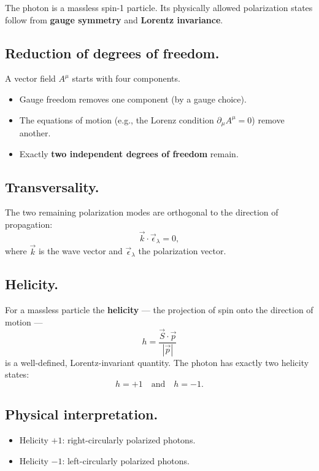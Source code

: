 The photon is a massless spin-1 particle. Its physically allowed polarization states
follow from \textbf{gauge symmetry} and \textbf{Lorentz invariance}.

\subsection*{Reduction of degrees of freedom.}
A vector field \( A^\mu \) starts with four components.
\begin{itemize}
	\item Gauge freedom removes one component (by a gauge choice).
	\item The equations of motion (e.g., the Lorenz condition \( \partial_\mu A^\mu = 0 \)) remove another.
	\item Exactly \textbf{two independent degrees of freedom} remain.
\end{itemize}

\subsection*{Transversality.}
The two remaining polarization modes are orthogonal to the direction of propagation:
\[
\vec{k} \cdot \vec{\epsilon}_\lambda = 0,
\]
where \( \vec{k} \) is the wave vector and \( \vec{\epsilon}_\lambda \) the polarization vector.

\subsection*{Helicity.}
For a massless particle the \textbf{helicity} — the projection of spin onto the direction of motion —
\[
h = \frac{\vec{S} \cdot \vec{p}}{|\vec{p}|}
\]
is a well-defined, Lorentz-invariant quantity.  
The photon has exactly two helicity states:
\[
h = +1 \quad \text{and} \quad h = -1 .
\]

\subsection*{Physical interpretation.}
\begin{itemize}
	\item Helicity \( +1 \): right-circularly polarized photons.
	\item Helicity \( -1 \): left-circularly polarized photons.
\end{itemize}


